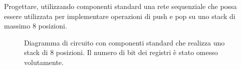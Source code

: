 \begin{exrc}
	Progettare, utilizzando componenti standard una rete sequenziale che possa
	essere utilizzata per implementare operazioni di push e pop su uno stack di
	massimo 8 posizioni.
	
	\begin{figure}[H]
		\centering
		\scalebox{0.5}{}
		\caption{Diagramma di circuito con componenti standard che realizza uno stack di 8 posizioni. Il numero di bit dei registri è stato omesso volutamente.}
		\label{fig:homeworkstack}
	\end{figure}
\end{exrc}